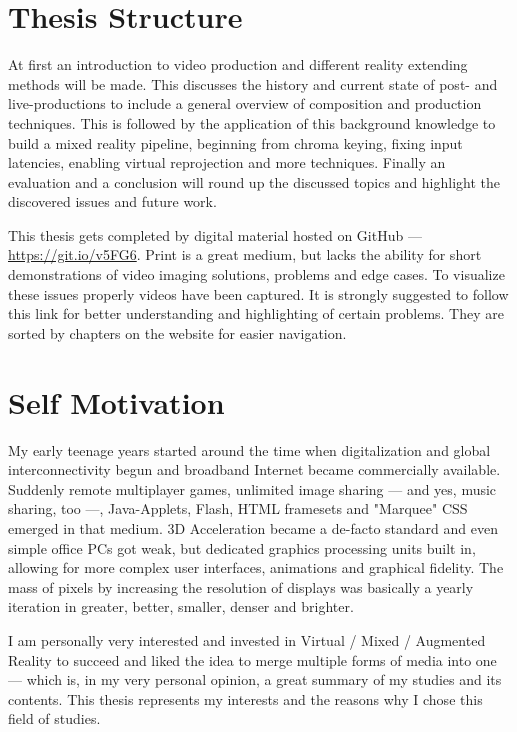 \section{Thesis Structure}
\label{sec:intro:structure}

At first an introduction to video production and different reality extending 
methods will be made. This discusses the history and current state of post- and 
live-productions to include a general overview of composition and production 
techniques.
\newline
This is followed by the application of this background knowledge to build a 
mixed reality pipeline, beginning from chroma keying, fixing input latencies, 
enabling virtual reprojection and more techniques.
\newline
Finally an evaluation and a conclusion will round up the discussed topics and 
highlight the discovered issues and future work.

This thesis gets completed by digital material hosted on GitHub --- 
\url{https://git.io/v5FG6}. Print is a 
great medium, but lacks the ability for short demonstrations of video imaging 
solutions, problems and edge cases. To visualize these issues properly videos 
have been captured. It is strongly suggested to follow this link for better 
understanding and highlighting of certain problems. They are sorted by chapters 
on the website for easier navigation.

\section{Self Motivation}
\label{sec:intro:self-motivation}

My early teenage years started around the time when digitalization and global
interconnectivity begun and broadband Internet became commercially available.
Suddenly remote multiplayer games, unlimited image sharing --- and yes, music
sharing, too ---, Java-Applets, Flash, HTML framesets and "Marquee" CSS emerged 
in that medium. 3D Acceleration became a de-facto standard and even simple 
office PCs got weak, but dedicated graphics processing units built in, allowing 
for more complex user interfaces, animations and graphical fidelity. The mass 
of pixels by increasing the resolution of displays was basically a yearly 
iteration in greater, better, smaller, denser and brighter.

I am personally very interested and invested in Virtual / Mixed / Augmented 
Reality to succeed and liked the idea to merge multiple forms of media into one 
--- which is, in my very personal opinion, a great summary of my studies and 
its contents. This thesis represents my interests and the reasons why I chose 
this field of studies.